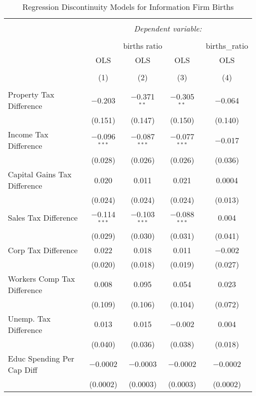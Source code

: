 
\begin{table}[!htbp] \centering 
  \caption{Regression Discontinuity Models for  Information Firm Births} 
  \label{51rd} 
\begin{tabular}{@{\extracolsep{5pt}}lcccc} 
\\[-1.8ex]\hline 
\hline \\[-1.8ex] 
 & \multicolumn{4}{c}{\textit{Dependent variable:}} \\ 
\cline{2-5} 
\\[-1.8ex] & \multicolumn{3}{c}{births ratio} & births\_ratio \\ 
 & OLS & OLS & OLS & OLS \\ 
\\[-1.8ex] & (1) & (2) & (3) & (4)\\ 
\hline \\[-1.8ex] 
 Property Tax Difference & $-$0.203 & $-$0.371$^{**}$ & $-$0.305$^{**}$ & $-$0.064 \\ 
  & (0.151) & (0.147) & (0.150) & (0.140) \\ 
  Income Tax Difference & $-$0.096$^{***}$ & $-$0.087$^{***}$ & $-$0.077$^{***}$ & $-$0.017 \\ 
  & (0.028) & (0.026) & (0.026) & (0.036) \\ 
  Capital Gains Tax Difference & 0.020 & 0.011 & 0.021 & 0.0004 \\ 
  & (0.024) & (0.024) & (0.024) & (0.013) \\ 
  Sales Tax Difference & $-$0.114$^{***}$ & $-$0.103$^{***}$ & $-$0.088$^{***}$ & 0.004 \\ 
  & (0.029) & (0.030) & (0.031) & (0.041) \\ 
  Corp Tax Difference & 0.022 & 0.018 & 0.011 & $-$0.002 \\ 
  & (0.020) & (0.018) & (0.019) & (0.027) \\ 
  Workers Comp Tax Difference & 0.008 & 0.095 & 0.054 & 0.023 \\ 
  & (0.109) & (0.106) & (0.104) & (0.072) \\ 
  Unemp. Tax Difference & 0.013 & 0.015 & $-$0.002 & 0.004 \\ 
  & (0.040) & (0.036) & (0.038) & (0.018) \\ 
  Educ Spending Per Cap Diff & $-$0.0002 & $-$0.0003 & $-$0.0002 & $-$0.0002 \\ 
  & (0.0002) & (0.0003) & (0.0003) & (0.0002) \\ 

\end{tabular}
\end{table}
